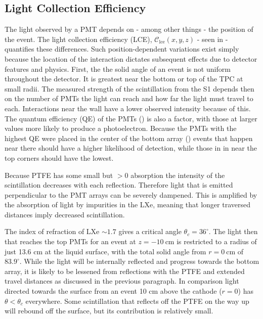 \subsection{Light Collection Efficiency}
\label{subsec:det_char_lce}
The light observed by a PMT depends on - among other things - the position of the event.  The light collection efficiency (LCE),
$\mathcal{C}_{\mathrm{lce}}(x, y, z)$ - seen in  - quantifies these differences.  Such
position-dependent variations exist simply because the location of
the interaction dictates subsequent effects due to detector features and physics.  First, the the solid angle of an event is not uniform
throughout the detector.  It is greatest near the bottom or top of the TPC at small radii.  The measured strength of the scintillation
from the S1 depends then on the number of PMTs the light can reach and how far the light must travel to each.  Interactions near the
wall have a lower observed intensity because of this.  The quantum efficiency (QE) of the PMTs () is also a
factor, with those at larger values more likely to produce a photoelectron.  Because the PMTs with the highest QE were placed in the
center of the bottom array () events that happen near there should have a higher likelihood of detection,
while those in in near the top corners should have the lowest.

Because PTFE has some small but $> 0$ absorption the intensity of the scintillation decreases with each reflection.  Therefore light
that is emitted perpendicular to the PMT arrays can be severely dampened.  This is amplified by the absorption of light by
impurities in the LXe, meaning that longer traversed distances imply decreased scintillation.

The index of refraction of LXe ${\sim} 1.7$
gives a critical angle $\theta_c = 36^{\circ}$.  The light then that reaches the top PMTs for an event at
$z = -10\ \mathrm{cm}$ is restricted to a radius of just 13.6 cm at the liquid surface, with the total solid angle from
$r = 0\ \mathrm{cm}$ of $83.9^{\circ}$.  While the light will be internally reflected and progress towards the bottom array, it is likely
to be lessened from reflections with the PTFE and extended travel distances as discussed in the previous paragraph. In comparison light
directed towards the surface from an event 10 cm above the cathode ($r = 0$)
has $\theta < \theta_c$ everywhere.  Some scintillation that reflects off the PTFE on the way up will rebound off the surface, but its
contribution is relatively small.

